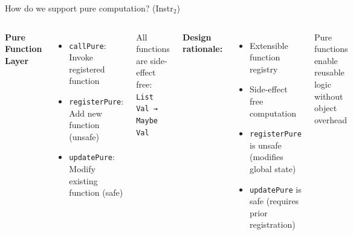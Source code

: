 \documentclass[handout,aspectratio=169,xcolor=dvipsnames,10pt]{beamer}
\begin{document}
\begin{frame}{How do we support pure computation? (Instr$_2$)}

\vfill

\begin{columns}[T]
\textbf{Pure Function Layer}

\vspace{0.5em}

\begin{itemize}
  \item \texttt{callPure}: Invoke registered function
  \item \texttt{registerPure}: Add new function (unsafe)
  \item \texttt{updatePure}: Modify existing function (safe)
\end{itemize}

\vspace{0.5em}

{\small All functions are side-effect free: \texttt{List Val → Maybe Val}}


\textbf{Design rationale:}

\begin{itemize}\small
  \item Extensible function registry
  \item Side-effect free computation
  \item \texttt{registerPure} is unsafe (modifies global state)
  \item \texttt{updatePure} is safe (requires prior registration)
\end{itemize}

\vspace{0.5em}

{\scriptsize Pure functions enable reusable logic without object overhead}

\end{columns}

\vfill

\end{frame}

\end{document}
